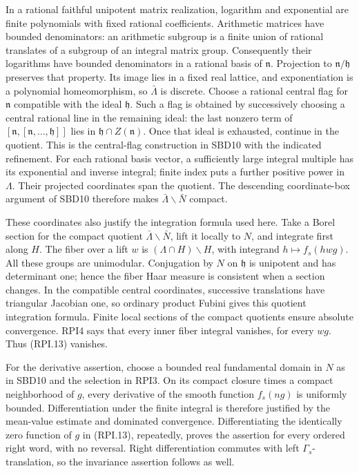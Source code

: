 In a rational faithful unipotent matrix realization, logarithm
and exponential are finite polynomials with fixed rational
coefficients.  Arithmetic matrices have bounded denominators:
an arithmetic subgroup is a finite union of rational translates
of a subgroup of an integral matrix group.  Consequently their
logarithms have bounded denominators in a rational basis of
\(\mathfrak n\).  Projection to
\(\mathfrak n/\mathfrak h\) preserves that property.
Its image lies in a fixed real lattice, and exponentiation
is a polynomial homeomorphism, so \(\bar\Lambda\) is discrete.
Choose a rational central flag for \(\mathfrak n\) compatible
with the ideal \(\mathfrak h\).  Such a flag is obtained by
successively choosing a central rational line in the remaining
ideal: the last nonzero term of
\([\mathfrak n,[\mathfrak n,\ldots,\mathfrak h]]\) lies in
\(\mathfrak h\cap Z(\mathfrak n)\).  Once that ideal is exhausted,
continue in the quotient.  This is the central-flag construction
in SBD10 with the indicated refinement.
For each rational basis vector, a sufficiently large integral
multiple has its exponential and inverse integral; finite index
puts a further positive power in \(\Lambda\).  Their projected
coordinates span the quotient.  The descending coordinate-box
argument of SBD10 therefore makes
\(\bar\Lambda\backslash\bar N\) compact.

These coordinates also justify the integration formula used
here.  Take a Borel section for the compact quotient
\(\bar\Lambda\backslash\bar N\), lift it locally to \(N\),
and integrate first along \(H\).  The fiber over a lift \(w\)
is \((\Lambda\cap H)\backslash H\), with integrand
\(h\mapsto f_s(hw g)\).  All these groups are unimodular.
Conjugation by \(N\) on \(\mathfrak h\) is unipotent and
has determinant one; hence the fiber Haar measure is
consistent when a section changes.  In the compatible central
coordinates, successive translations have triangular Jacobian
one, so ordinary product Fubini gives this quotient integration
formula.  Finite local sections of the compact quotients ensure
absolute convergence.  RPI4 says that every inner fiber integral
vanishes, for every \(wg\).  Thus (RPI.13) vanishes.

For the derivative assertion, choose a bounded real fundamental
domain in \(N\) as in SBD10 and the selection in RPI3.
On its compact closure times a compact neighborhood of \(g\),
every derivative of the smooth function \(f_s(ng)\) is
uniformly bounded.  Differentiation under the finite integral
is therefore justified by the mean-value estimate and dominated
convergence.  Differentiating the identically zero function
of \(g\) in (RPI.13), repeatedly, proves the assertion for
every ordered right word, with no reversal.  Right
differentiation commutes with left \(\Gamma_s\)-translation,
so the invariance assertion follows as well.

